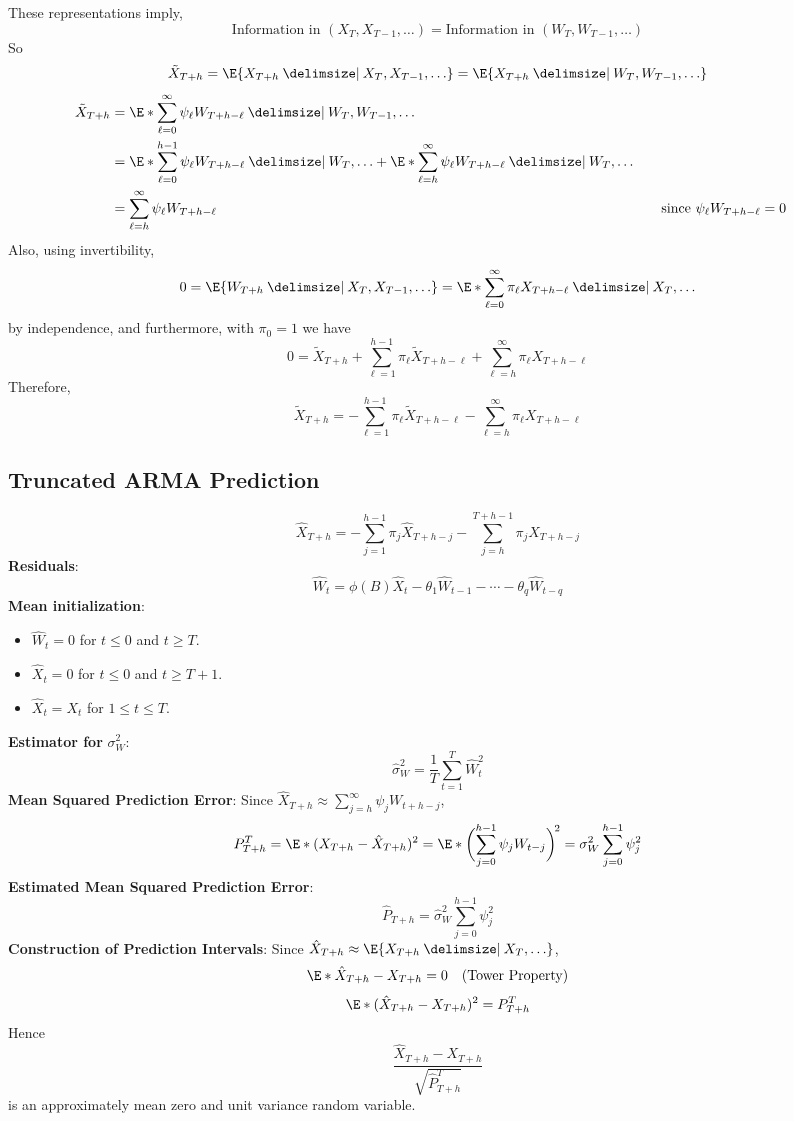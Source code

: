 These representations imply,
\[ \text{Information in }(X_T,X_{T-1},\ldots)=\text{Information in }
    (W_T,W_{T-1},\ldots) \]
So
\[ \tilde{X}_{T+h}=\E{X_{T+h}\given X_{T},X_{T-1},\ldots}=
    \E{X_{T+h}\given W_{T},W_{T-1},\ldots} \]
\begin{align*}
    \tilde{X}_{T+h}
     & =\E*{\sum_{\ell=0}^{\infty} \psi_\ell W_{T+h-\ell}\given W_T,W_{T-1},\ldots}                                                     \\
     & =\E*{\sum_{\ell=0}^{h-1} \psi_\ell W_{T+h-\ell}\given W_T,\ldots}
    +\E*{\sum_{\ell=h}^{\infty} \psi_\ell W_{T+h-\ell}\given W_{T},\ldots}                                                              \\
     & =\sum_{\ell=h}^{\infty} \psi_\ell W_{T+h-\ell}                               & \quad & \text{since $ \psi_\ell W_{T+h-\ell}=0 $}
\end{align*}
Also, using invertibility,
\[ 0=\E{W_{T+h}\given X_T,X_{T-1},\ldots}=
    \E*{\sum_{\ell=0}^{\infty} \pi_\ell X_{T+h-\ell}\given X_T,\ldots} \]
by independence, and furthermore, with $ \pi_0=1 $ we have
\[ 0=\tilde{X}_{T+h}+\sum_{\ell=1}^{h-1} \pi_\ell \tilde{X}_{T+h-\ell}+
    \sum_{\ell=h}^{\infty} \pi_\ell X_{T+h-\ell} \]
Therefore,
\[ \tilde{X}_{T+h}=-\sum_{\ell=1}^{h-1} \pi_\ell \tilde{X}_{T+h-\ell}-
    \sum_{\ell=h}^{\infty} \pi_\ell X_{T+h-\ell} \]

\subsection*{Truncated ARMA Prediction}
\[ \hat{X}_{T+h}=-\sum_{j=1}^{h-1}\pi_j\hat{X}_{T+h-j}-\sum_{j=h}^{T+h-1} \pi_j X_{T+h-j}  \]
\textbf{Residuals}:
\[ \hat{W}_t=\phi(B)\hat{X}_t-\theta_1\hat{W}_{t-1}-\cdots-\theta_q \hat{W}_{t-q} \]
\textbf{Mean initialization}:
\begin{itemize}
    \item $ \hat{W}_t=0 $ for $ t\le 0 $ and $ t\ge T $.
    \item $ \hat{X}_t=0 $ for $ t\le 0 $ and $ t\ge T+1 $.
    \item $ \hat{X}_t=X_t $ for $ 1\le t\le T $.
\end{itemize}
\textbf{Estimator for} $ \sigma_W^2 $:
\[ \hat{\sigma}_W^2=
    \frac{1}{T} \sum_{t=1}^{T} \hat{W}_t^2 \]
\textbf{Mean Squared Prediction Error}:
Since $ \hat{X}_{T+h}\approx \sum_{j=h}^{\infty} \psi_j W_{t+h-j} $,
\[ P_{T+h}^T=\E*{(X_{T+h}-\hat{X}_{T+h})^2}
    =\E*{\biggl(\sum_{j=0}^{h-1} \psi_j W_{t-j}\biggr)^{\!2}}=\sigma_W^2 \sum_{j=0}^{h-1} \psi_j^2 \]
\textbf{Estimated Mean Squared Prediction Error}:
\[ \hat{P}_{T+h}=\hat{\sigma}_W^2 \sum_{j=0}^{h-1} \psi_j^2 \]
\textbf{Construction of Prediction Intervals}:
Since $ \hat{X}_{T+h}\approx \E{X_{T+h}\given X_T,\ldots} $,
\[ \E*{\hat{X}_{T+h}-X_{T+h}}=0\quad(\text{Tower Property}) \]
\[ \E*{(\hat{X}_{T+h}-X_{T+h})^2}=P_{T+h}^T \]
Hence
\[ \frac{\hat{X}_{T+h}-X_{T+h}}{\sqrt{\hat{P}_{T+h}^T}}  \]
is an approximately mean zero and unit variance random variable.

